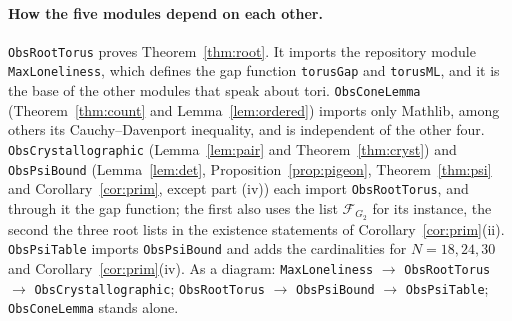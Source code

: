 \documentclass[11pt]{amsart}
\theoremstyle{definition}
\theoremstyle{remark}
\newcommand{\lean}[1]{\texttt{#1}}
\begin{document}
\paragraph{How the five modules depend on each other.} \lean{ObsRootTorus} proves Theorem~\ref{thm:root}. It imports the repository module \lean{MaxLoneliness}, which defines the gap function \lean{torusGap} and \lean{torusML}, and it is the base of the other modules that speak about tori. \lean{ObsConeLemma} (Theorem~\ref{thm:count} and Lemma~\ref{lem:ordered}) imports only Mathlib, among others its Cauchy--Davenport inequality, and is independent of the other four. \lean{ObsCrystallographic} (Lemma~\ref{lem:pair} and Theorem~\ref{thm:cryst}) and \lean{ObsPsiBound} (Lemma~\ref{lem:det}, Proposition~\ref{prop:pigeon}, Theorem~\ref{thm:psi} and Corollary~\ref{cor:prim}, except part (iv)) each import \lean{ObsRootTorus}, and through it the gap function; the first also uses the list $\mathcal F_{G_2}$ for its instance, the second the three root lists in the existence statements of Corollary~\ref{cor:prim}(ii). \lean{ObsPsiTable} imports \lean{ObsPsiBound} and adds the cardinalities for $N=18,24,30$ and Corollary~\ref{cor:prim}(iv). As a diagram: \lean{MaxLoneliness} $\to$ \lean{ObsRootTorus} $\to$ \lean{ObsCrystallographic}; \lean{ObsRootTorus} $\to$ \lean{ObsPsiBound} $\to$ \lean{ObsPsiTable}; \lean{ObsConeLemma} stands alone.
\end{document}
